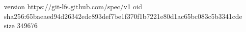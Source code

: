 version https://git-lfs.github.com/spec/v1
oid sha256:65baeaed94d26342edc893def7be1f370f1b7221e80d1ac65bc083c5b3341cde
size 349676
